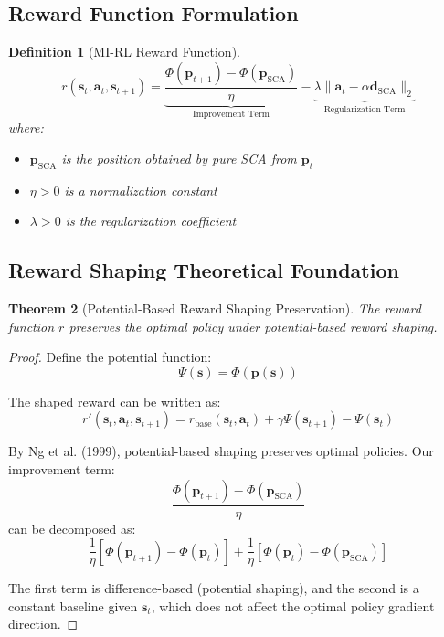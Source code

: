 \documentclass[11pt,a4paper]{article}
\newtheorem{theorem}{Theorem}[section]
\newtheorem{definition}[theorem]{Definition}
\newcommand{\bs}{\mathbf{s}}
\newcommand{\ba}{\mathbf{a}}
\newcommand{\bp}{\mathbf{p}}
\newcommand{\dsca}{\mathbf{d}_{\text{SCA}}}
\newcommand{\psca}{\mathbf{p}_{\text{SCA}}}
\begin{document}
\subsection{Reward Function Formulation}

\begin{definition}[MI-RL Reward Function]
\begin{equation}
    r(\bs_t, \ba_t, \bs_{t+1}) = \underbrace{\frac{\Phi(\bp_{t+1}) - \Phi(\psca)}{\eta}}_{\text{Improvement Term}} - \underbrace{\lambda \|\ba_t - \alpha\dsca\|_2}_{\text{Regularization Term}}
\end{equation}
where:
\begin{itemize}
    \item $\psca$ is the position obtained by pure SCA from $\bp_t$
    \item $\eta > 0$ is a normalization constant
    \item $\lambda > 0$ is the regularization coefficient
\end{itemize}
\end{definition}

\subsection{Reward Shaping Theoretical Foundation}

\begin{theorem}[Potential-Based Reward Shaping Preservation]
\label{thm:shaping}
The reward function $r$ preserves the optimal policy under potential-based reward shaping.
\end{theorem}

\begin{proof}
Define the potential function:
\begin{equation}
    \Psi(\bs) = \Phi(\bp(\bs))
\end{equation}

The shaped reward can be written as:
\begin{equation}
    r'(\bs_t, \ba_t, \bs_{t+1}) = r_{\text{base}}(\bs_t, \ba_t) + \gamma\Psi(\bs_{t+1}) - \Psi(\bs_t)
\end{equation}

By Ng et al. (1999), potential-based shaping preserves optimal policies. Our improvement term:
\begin{equation}
    \frac{\Phi(\bp_{t+1}) - \Phi(\psca)}{\eta}
\end{equation}
can be decomposed as:
\begin{equation}
    \frac{1}{\eta}\left[\Phi(\bp_{t+1}) - \Phi(\bp_t)\right] + \frac{1}{\eta}\left[\Phi(\bp_t) - \Phi(\psca)\right]
\end{equation}

The first term is difference-based (potential shaping), and the second is a constant baseline given $\bs_t$, which does not affect the optimal policy gradient direction.
\end{proof}
\end{document}
